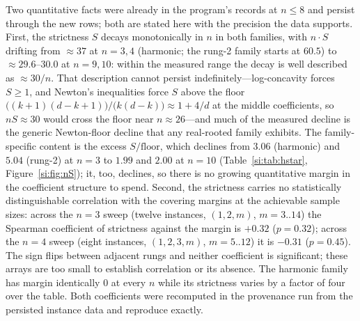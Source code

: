 Two quantitative facts were already in the program's records at $n\le8$
and persist through the new rows; both are stated here with the precision
the data supports. First, the strictness $S$ decays monotonically in $n$
in both families, with $n\cdot S$ drifting from $\approx37$ at
$n=3,4$ (harmonic; the rung-2 family starts at $60.5$) to
$\approx29.6$--$30.0$ at $n=9,10$: within the measured range the decay
is well described as $\approx30/n$. That description cannot persist
indefinitely---log-concavity forces $S\ge1$, and Newton's inequalities
force $S$ above the floor $\bigl((k{+}1)(d{-}k{+}1)\bigr)/\bigl(k(d{-}k)
\bigr)\approx1+4/d$ at the middle coefficients, so $nS\approx30$ would
cross the floor near $n\approx26$---and much of the measured decline is
the generic Newton-floor decline that any real-rooted family exhibits.
The family-specific content is the excess $S/\text{floor}$, which declines
from $3.06$ (harmonic) and $5.04$ (rung-2) at $n=3$ to $1.99$ and
$2.00$ at $n=10$ (Table~\ref{si:tab:hstar}, Figure~\ref{si:fig:nS}); it, too,
declines, so there is no growing quantitative margin in the coefficient
structure to spend. Second, the strictness carries no statistically
distinguishable correlation with the covering margins at the achievable
sample sizes: across the $n=3$ sweep (twelve instances, $(1,2,m)$,
$m=3..14$) the Spearman coefficient of strictness against the margin is
$+0.32$ ($p=0.32$); across the $n=4$ sweep (eight instances,
$(1,2,3,m)$, $m=5..12$) it is $-0.31$ ($p=0.45$). The sign flips
between adjacent rungs and neither coefficient is significant; these
arrays are too small to establish correlation or its absence. The
harmonic family has margin identically $0$ at every $n$ while its
strictness varies by a factor of four over the table. Both coefficients
were recomputed in the provenance run from the persisted instance data
and reproduce exactly.

